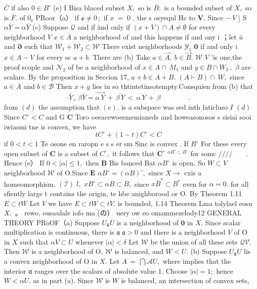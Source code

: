 $\bar{C}$ if also $0\in B^{\circ}$ (e) I Bisa blaced subset $X,$ so is ${\overline{{B}}}\colon$ is a bounded subset of $X,$ so is ${\overline{{F}}}.$ of $0_{\mathrm{{s}}}$ PRoor（a） if ${\mathcal{x}}\neq0\,;$ if $\scriptstyle x\;=\;0$ . the s osyequl Hc to ${\boldsymbol{V}}.$ Since $-\,V\,\rfloor$ S $\alpha{\bar{Y}}=\alpha{\bar{Y}}$ (c) Suppose $\textstyle{\mathcal{Q}}$ and if ànd only if $(x+V)\cap A\neq\emptyset$ for every neighborhood ${\mathbf{}}V$ $x\in{\overline{{A}}}$ a neighborhood of and this happens if and ony i ；let $\bar{u}$ and $\boldsymbol{\partial}$ such that $\mathcal{W}_{1}+\mathcal{W}_{2}\subset\mathcal{W}$ There exist neighborhoods ${\mathcal{Y}}_{1}$ $\mathbf{0}$ if and only i $x\in A-V$ for every sc $a+b.$ There are (b) Take $a\in{\vec{A}},\ b\in{\vec{B}}.$ ${\mathcal{W}}$ ${\mathbf{}}V$ 'is one,the proof scople and ${\mathcal{N}}_{2}$ of be a neighborhood of $x\in A\cap\ M_{1}$ and $y\in B\cap W_{2}\,,$ $\beta$ are scalars. By the proposition in Seccion 17, $a+b\in{\overline{{A+B}}}.$ $(A\vdash B)\cap\ W,$ since $a\in{\overline{{A}}}$ and $b\in{\mathcal{B}}$ Then $x+y$ lies in so thtintetinsotempty.Consquien from (b) that $$ \cdot\bar{Y}_{+}\,\beta\bar{Y}=\vec{\alpha\,Y}\,+\,\bar{\beta\,Y}\,<\,\overline{{{\alpha\,Y}}}\,+\,\beta\qquad\qquad. $$ from $(d)$ the assumption that $(e).$ is a subspace was sed inth laticluso $\boldsymbol{\mathit{I}}$ $(d)$ Since $C^{\circ}<C$ and G ${\mathbf{C}}$ Toro oeeacewoesmemianeds and howeasonosos s sisiai sooi iwiasmi tne is convex, we have $$ t C^{\circ}+(1-t)C^{\circ}<C $$ if $0<t<1$ Te osone en raropn e s s er sm Sinc is convex . If $B^{\circ}$ For these every open subset of ${\boldsymbol{C}}$ is a subset of ${C}^{\circ},$ it follows that ${\boldsymbol{C}}^{\circ}$ $^{\alpha B^{\circ}\subset B^{\circ}}$ for somc ${\big/}{\big/}{\big/}{\big/}\qquad.$ Hence (e） If $0<|\alpha|\leq1,$ then ${\boldsymbol{B}}$ Bis banced Bat $\alpha B^{\circ}$ is open. So $W\subset V$ neighborhood ${\mathcal{W}}$ of O.Since ${\boldsymbol{E}}$ $\alpha B^{\circ}=(\alpha B)^{\circ},$ since $X\to$ cxis a homeomorphism. $({\mathcal{I}})$ ${\mathit{l}},$ $x B^{\circ}\subset\alpha B\subset B,$ since $x{\bar{B}}^{*}\subset B^{*}$ even for $\alpha=0.$ for all sfiently large t contains the origin, te hbe anighborood or O. By Theorem 1.11 $E\subset t W$ Let ${\mathbf{}}V$ we have $E\subset t W\subset t V.$ is bounded, 1.14 Theorem Lma tolylael eosu $X,$ 。 rewo, ousaulale iofo ma (の） uery ow eo omammezelody12 GENERAL THEORY PRoOF（a) Suppose $U_{\mathbf{\delta}}U$ is a neighborhood of $\mathbf{0}$ in $X.$ Since scalar multiplication is continuous, there is ${\mathfrak{a}}\;{\mathfrak{\mathfrak{a}}}>0$ and there is a neighborhood ${\mathbf{}}V$ of O in $\textstyle X$ such that $\alpha V\subset U$ whenever $|\alpha|<\delta$ Let $\mathcal{W}$ be the union of all these sets ${\mathcal{Q V}}.$ Then ${\mathcal{W}}$ is a neighborhood of O, ${\mathcal{W}}$ is balanced, and $W<U.$ (b) Suppose $U_{\mathbf{\delta}}U$ lis a convex neighborhood of O in $X.$ Let $A\,=\,\bigcap{\mathcal{A}}U,$ where implies that the interior α ranges over the scalars of absolute value 1. Choose $|\alpha|=1;$ hence $W<\alpha U.$ as in part (a). Since ${\mathcal{W}}$ is $W$ is balanced, an intersection of convex sets, 